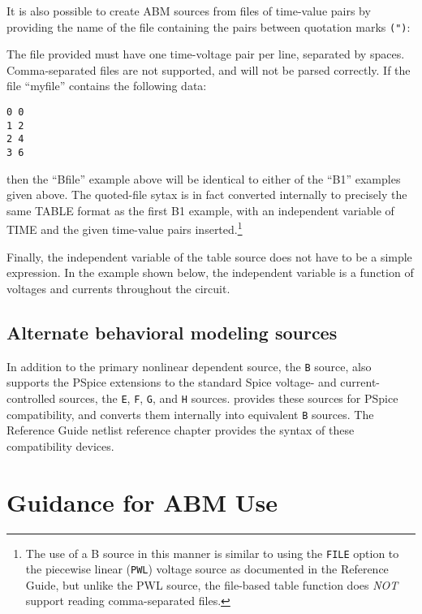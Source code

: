 It is also possible to create ABM sources from files of time-value pairs by providing the name of the file containing the pairs between quotation marks \texttt{(")}:


The file provided must have one time-voltage pair per line, separated
by spaces.  Comma-separated files are not supported, and will not be
parsed correctly.  If the file ``myfile'' contains the following data:
\begin{verbatim}
0 0
1 2
2 4
3 6
\end{verbatim}
then the ``Bfile'' example above will be identical to either of the
``B1'' examples given above.  The quoted-file sytax is in fact converted
internally to precisely the same TABLE format as the first B1 example,
with an independent variable of TIME and the given time-value pairs
inserted.\footnote{The use of a B source in this manner is similar to using the \texttt{FILE} option to the piecewise linear (\texttt{PWL}) voltage source as documented in the \Xyce{} Reference Guide\ReferenceGuide, but unlike the PWL source, the file-based table function does {\em NOT\/} support reading comma-separated files.}

Finally, the independent variable of the table source does not have to be a
simple expression.  In the example shown below, the independent variable is
a function of voltages and currents throughout the circuit.


\subsection{Alternate behavioral modeling sources}

In addition to the primary nonlinear dependent source, the \verb+B+
source, \Xyce{} also supports the PSpice extensions to the standard
Spice voltage- and current-controlled sources, the \verb+E+, \verb+F+,
\verb+G+, and \verb+H+ sources.  \Xyce{} provides these sources for
PSpice compatibility, and converts them internally into equivalent
\verb+B+ sources.  The \Xyce{} Reference Guide\ReferenceGuide{} netlist
reference chapter provides the syntax of these compatibility devices.

\section{Guidance for ABM Use}
\label{ABM_Guidance}

